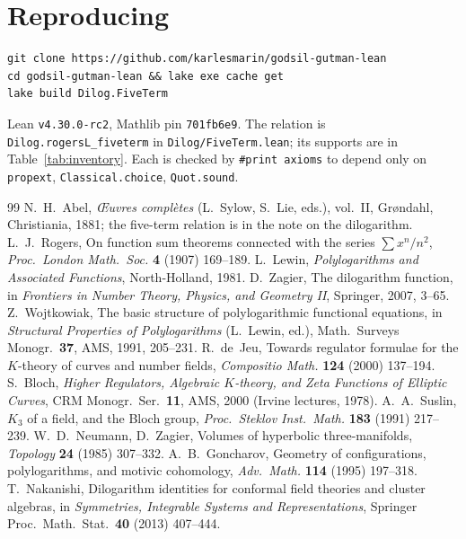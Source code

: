 \documentclass[11pt]{article}
\newcommand{\lean}[1]{\texttt{#1}}
\begin{document}
\section*{Reproducing}
\begin{verbatim}
git clone https://github.com/karlesmarin/godsil-gutman-lean
cd godsil-gutman-lean && lake exe cache get
lake build Dilog.FiveTerm
\end{verbatim}
Lean \lean{v4.30.0-rc2}, Mathlib pin \lean{701fb6e9}. The relation is
\lean{Dilog.rogersL\_fiveterm} in \lean{Dilog/FiveTerm.lean}; its supports are in
Table~\ref{tab:inventory}. Each is checked by \lean{\#print axioms} to depend only on
\lean{propext}, \lean{Classical.choice}, \lean{Quot.sound}.

\begin{thebibliography}{99}\small
{} N.~H.~Abel, \emph{\OE uvres compl\`etes} (L.~Sylow, S.~Lie, eds.), vol.~II,
Gr{\o}ndahl, Christiania, 1881; the five-term relation is in the note on the dilogarithm.
 L.~J.~Rogers, On function sum theorems connected with the series
$\sum x^n/n^2$, \emph{Proc.\ London Math.\ Soc.} \textbf{4} (1907) 169--189.
 L.~Lewin, \emph{Polylogarithms and Associated Functions}, North-Holland,
1981.
 D.~Zagier, The dilogarithm function, in \emph{Frontiers in Number Theory,
Physics, and Geometry II}, Springer, 2007, 3--65.
 Z.~Wojtkowiak, The basic structure of polylogarithmic functional
equations, in \emph{Structural Properties of Polylogarithms} (L.~Lewin, ed.), Math.\
Surveys Monogr.\ \textbf{37}, AMS, 1991, 205--231.
 R.~de~Jeu, Towards regulator formulae for the $K$-theory of curves and
number fields, \emph{Compositio Math.} \textbf{124} (2000) 137--194.
\bibitem{bloch} S.~Bloch, \emph{Higher Regulators, Algebraic $K$-theory, and Zeta Functions
of Elliptic Curves}, CRM Monogr.\ Ser.\ \textbf{11}, AMS, 2000 (Irvine lectures, 1978).
\bibitem{suslin} A.~A.~Suslin, $K_3$ of a field, and the Bloch group, \emph{Proc.\ Steklov
Inst.\ Math.} \textbf{183} (1991) 217--239.
 W.~D.~Neumann, D.~Zagier, Volumes of hyperbolic three-manifolds,
\emph{Topology} \textbf{24} (1985) 307--332.
 A.~B.~Goncharov, Geometry of configurations, polylogarithms, and
motivic cohomology, \emph{Adv.\ Math.} \textbf{114} (1995) 197--318.
\bibitem{nakanishi} T.~Nakanishi, Dilogarithm identities for conformal field theories and
cluster algebras, in \emph{Symmetries, Integrable Systems and Representations}, Springer
Proc.\ Math.\ Stat.\ \textbf{40} (2013) 407--444.

\end{thebibliography}
\end{document}
